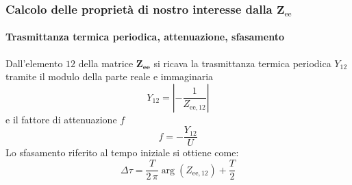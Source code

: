 \documentclass[aspectratio=141,10pt]{beamer}
\begin{document}
\begin{frame}
\frametitle{Calcolo delle proprietà di nostro interesse dalla $\mathbf{Z}_{\text{ee}}$}
\framesubtitle{Trasmittanza termica periodica, attenuazione, sfasamento}
    Dall'elemento {\footnotesize $12$} della matrice $\mathbf{Z_{\text{ee}}}$ si ricava la trasmittanza termica periodica $Y_{12}$ tramite il modulo della parte reale e immaginaria
\begin{equation*}
    Y_{12} = \left\lvert -\frac{1}{Z_{\text{ee},12}}\right\rvert 
\end{equation*} 
e il fattore di attenuazione $f$
\begin{equation*}
    f = -\frac{Y_{12}}{U} 
\end{equation*}
Lo sfasamento riferito al tempo iniziale si ottiene come:
\begin{equation*}
    \Delta \tau = \frac{T}{2\,\pi}\arg\left(Z_{\text{ee},12}\right) + \frac{T}{2} 
\end{equation*}
\pause 
\centering
{}
\end{frame}
\end{document}
